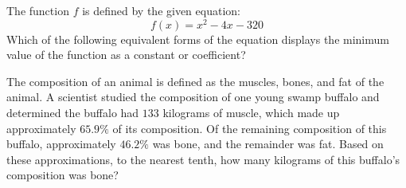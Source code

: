 The function \(f\) is defined by the given equation:
\[
f(x) = x^2 - 4x - 320
\]
Which of the following equivalent forms of the equation displays the minimum value of the function as a constant or coefficient?

\vspace{0.75em}


\vspace{2em}
\newpage

\noindent\markforreview
\vspace{1em}

The composition of an animal is defined as the muscles, bones, and fat of the animal. A scientist studied the composition of one young swamp buffalo and determined the buffalo had \(133\) kilograms of muscle, which made up approximately \(65.9\%\) of its composition. Of the remaining composition of this buffalo, approximately \(46.2\%\) was bone, and the remainder was fat. Based on these approximations, to the nearest tenth, how many kilograms of this buffalo's composition was bone?

\vspace{2em}
